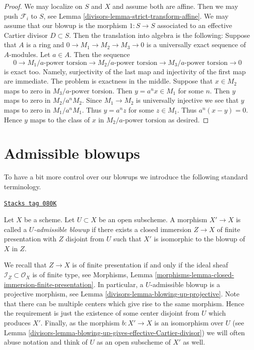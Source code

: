 \begin{proof}

We may localize on $S$ and $X$ and assume both are affine.
Then we may push $\mathcal{F}_i$ to $S$, see
Lemma \ref{divisors-lemma-strict-transform-affine}.
We may assume that our blowup is the morphism $1 : S \to S$
associated to an effective Cartier divisor $D \subset S$.
Then the translation into algebra is the following: Suppose that $A$
is a ring and $0 \to M_1 \to M_2 \to M_3 \to 0$ is a universally
exact sequence of $A$-modules. Let $a\in A$. Then the sequence
$$
0 \to
M_1/a\text{-power torsion} \to
M_2/a\text{-power torsion} \to
M_3/a\text{-power torsion} \to 0
$$
is exact too. Namely, surjectivity of the last map and injectivity of
the first map are immediate. The problem is exactness in the middle.
Suppose that $x \in M_2$ maps to zero in $M_3/a\text{-power torsion}$.
Then $y = a^n x \in M_1$ for some $n$. Then $y$ maps to zero in
$M_2/a^nM_2$. Since $M_1 \to M_2$ is universally injective we see that
$y$ maps to zero in $M_1/a^nM_1$. Thus $y = a^n z$ for some $z \in M_1$.
Thus $a^n(x - y) = 0$. Hence $y$ maps to the class of $x$ in
$M_2/a\text{-power torsion}$ as desired.
\end{proof}

\section{Admissible blowups}
\label{divisors-section-admissible-blowups}
To have a bit more control over our blowups we introduce the following
standard terminology.

\begin{definition}
\label{divisors-definition-admissible-blowup}
\href{https://stacks.math.columbia.edu/tag/080K}{\texttt{Stacks tag 080K}}

Let $X$ be a scheme. Let $U \subset X$ be an open subscheme. A morphism
$X' \to X$ is called a {\it $U$-admissible blowup} if there exists a
closed immersion $Z \to X$ of finite presentation with $Z$ disjoint from
$U$ such that $X'$ is isomorphic to the blowup of $X$ in $Z$.
\end{definition}

We recall that $Z \to X$ is of finite presentation if and only if the
ideal sheaf $\mathcal{I}_Z \subset \mathcal{O}_X$ is of finite type, see
Morphisms, Lemma \ref{morphisms-lemma-closed-immersion-finite-presentation}.
In particular, a $U$-admissible blowup is a projective morphism, see
Lemma \ref{divisors-lemma-blowing-up-projective}.
Note that there can be multiple centers which give rise to the same morphism.
Hence the requirement is just the existence of some center disjoint from
$U$ which produces $X'$.
Finally, as the morphism $b : X' \to X$ is an isomorphism over $U$ (see
Lemma \ref{divisors-lemma-blowing-up-gives-effective-Cartier-divisor}) we will often
abuse notation and think of $U$ as an open subscheme of $X'$ as well.


